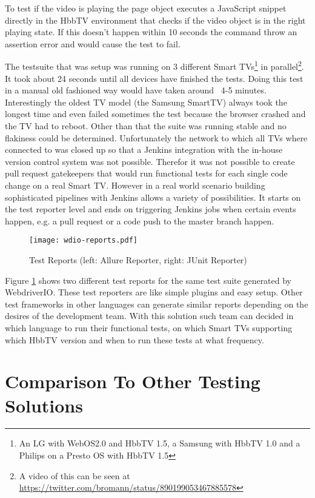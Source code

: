 To test if the video is playing the page object executes a JavaScript snippet directly in the HbbTV environment that checks if the video object is in the right playing state. If this doesn't happen within 10 seconds the command throw an assertion error and would cause the test to fail.

The testsuite that was setup was running on 3 different Smart TVs\footnote{An LG with WebOS2.0 and HbbTV 1.5, a Samsung with HbbTV 1.0 and a Philips on a Presto OS with HbbTV 1.5} in parallel\footnote{A video of this can be seen at \url{https://twitter.com/bromann/status/890199053467885578}}. It took about 24 seconds until all devices have finished the tests. Doing this test in a manual old fashioned way would have taken around ~4-5 minutes. Interestingly the oldest TV model (the Samsung SmartTV) always took the longest time and even failed sometimes the test because the browser crashed and the TV had to reboot. Other than that the suite was running stable and no flakiness could be determined. Unfortunately the network to which all TVs where connected to was closed up so that a Jenkins integration with the in-house version control system was not possible. Therefor it was not possible to create pull request gatekeepers that would run functional tests for each single code change on a real Smart TV. However in a real world scenario building sophisticated pipelines with Jenkins allows a variety of possibilities. It starts on the test reporter level and ends on triggering Jenkins jobs when certain events happen, e.g. a pull request or a code push to the master branch happen.

\begin{figure}[htb]
  \centering
  \hspace*{-0.5cm}
  \texttt{[image: wdio-reports.pdf]}\\
  \caption{Test Reports (left: Allure Reporter, right: JUnit Reporter)}\label{fig:wdioreports}
\end{figure}

Figure \ref{fig:wdioreports} shows two different test reports for the same test suite generated by WebdriverIO. These test reporters are like simple plugins and easy setup. Other test frameworks in other languages can generate similar reports depending on the desires of the development team. With this solution such team can decided in which language to run their functional tests, on which Smart TVs supporting which HbbTV version and when to run these tests at what frequency.

\section{Comparison To Other Testing Solutions\label{sec:businessmodel}}

